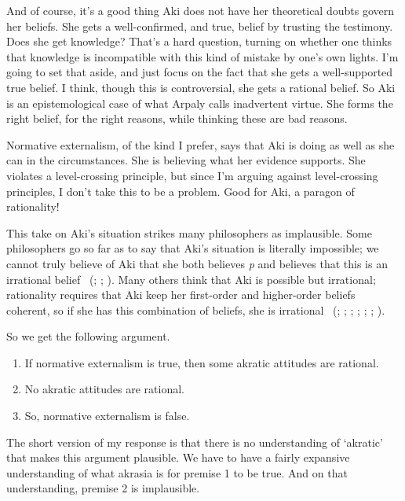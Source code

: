 \documentclass[
  10pt,
  letterpaper,
  twoside]{scrbook}
\providecommand{\tightlist}{%
  \setlength{\itemsep}{0pt}\setlength{\parskip}{0pt}}\usepackage{longtable,booktabs,array}
\begin{document}
And of course, it's a good thing {Aki} does not have her theoretical
doubts govern her beliefs. She gets a well-confirmed, and true, belief
by trusting the testimony. Does she get knowledge? That's a hard
question, turning on whether one thinks that knowledge is incompatible
with this kind of mistake by one's own lights. I'm going to set that
aside, and just focus on the fact that she gets a well-supported true
belief. I think, though this is controversial, she gets a rational
belief. So {Aki} is an epistemological case of what Arpaly calls
inadvertent virtue. She forms the right belief, for the right reasons,
while thinking these are bad reasons.

Normative externalism, of the kind I prefer, says that {Aki} is doing as
well as she can in the circumstances. She is believing what her evidence
supports. She violates a level-crossing principle, but since I'm arguing
against level-crossing principles, I don't take this to be a problem.
Good for {Aki}, a paragon of rationality!

This take on {Aki}'s situation strikes many philosophers as implausible.
Some philosophers go so far as to say that {Aki}'s situation is
literally impossible; we cannot truly believe of {Aki} that she both
believes \emph{p} and believes that this is an irrational belief
~(; ; ). Many others think that
{Aki} is possible but irrational; rationality requires that {Aki} keep
her first-order and higher-order beliefs coherent, so if she has this
combination of beliefs, she is irrational
~(;
;
;
;
;
;
).

So we get the following argument.

\begin{enumerate}
\def\labelenumi{\arabic{enumi}.}
\tightlist
\item
  If normative externalism is true, then some akratic attitudes are
  rational.
\item
  No akratic attitudes are rational.
\item
  So, normative externalism is false.
\end{enumerate}

The short version of my response is that there is no understanding of
`akratic' that makes this argument plausible. We have to have a fairly
expansive understanding of what akrasia is for premise 1 to be true. And
on that understanding, premise 2 is implausible.
\end{document}

